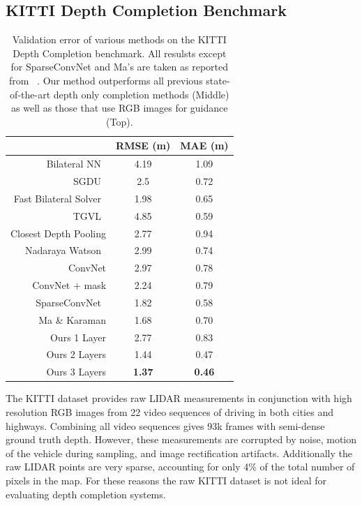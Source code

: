 \subsection{KITTI Depth Completion Benchmark}
\label{sec:kitti-depth-compl}
\begin{table}
\centering
\begin{tabular}{r|cc}
  \label{table:kitti}
  & RMSE (m) & MAE (m)\\\hline
  Bilateral NN~\cite{} & 4.19 & 1.09\\
  SGDU~\cite{} & 2.5 & 0.72\\
  Fast Bilateral Solver~\cite{} & 1.98 & 0.65\\
  TGVL~\cite{} & 4.85 & 0.59\\\hline
  Closest Depth Pooling & 2.77 & 0.94\\
  Nadaraya Watson~\cite{} & 2.99 & 0.74\\
  ConvNet & 2.97 & 0.78\\
  ConvNet + mask & 2.24 & 0.79\\
  SparseConvNet~\cite{} & 1.82 & 0.58\\
  Ma \& Karaman & 1.68 & 0.70\\\hline
  Ours 1 Layer & 2.77 & 0.83\\
  Ours 2 Layers & 1.44 & 0.47\\
  Ours 3 Layers & \textbf{1.37} & \textbf{0.46}\\
  \hline
 \end{tabular}
 \caption{Validation error of various methods on the KITTI Depth Completion benchmark. All resulsts except for SparseConvNet and Ma's are taken as reported from ~\cite{}. Our method outperforms all previous state-of-the-art depth only completion methods (Middle) as well as those that use RGB images for guidance (Top).}
\label{fig:kitti}
\end{table}




The KITTI dataset provides raw LIDAR measurements in conjunction with high resolution RGB images from 22 video sequences of driving in both cities and highways. Combining all video sequences gives 93k frames with semi-dense ground truth depth. However, these measurements are corrupted by noise, motion of the vehicle during sampling, and image rectification artifacts. Additionally the raw LIDAR points are very sparse, accounting for only 4\% of the total number of pixels in the map. For these reasons the raw KITTI dataset is not ideal for evaluating depth completion systems.\\

